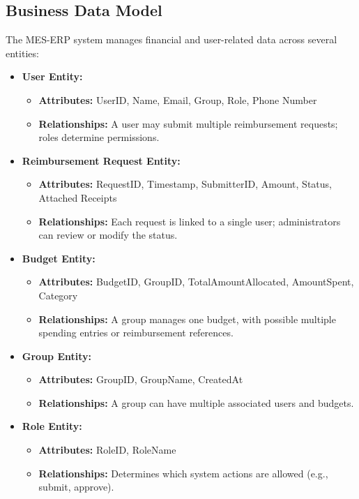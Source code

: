 \documentclass[12pt]{article}
\begin{document}
\subsection{Business Data Model}
The MES-ERP system manages financial and user-related data across several entities:

\begin{itemize}
    \item \textbf{User Entity:}
    \begin{itemize}
        \item \textbf{Attributes:} UserID, Name, Email, Group, Role, Phone Number
        \item \textbf{Relationships:} A user may submit multiple reimbursement requests; roles determine permissions.
    \end{itemize}
    
    \item \textbf{Reimbursement Request Entity:}
    \begin{itemize}
        \item \textbf{Attributes:} RequestID, Timestamp, SubmitterID, Amount, Status, Attached Receipts
        \item \textbf{Relationships:} Each request is linked to a single user; administrators can review or modify the status.
    \end{itemize}
    
    \item \textbf{Budget Entity:}
    \begin{itemize}
        \item \textbf{Attributes:} BudgetID, GroupID, TotalAmountAllocated, AmountSpent, Category
        \item \textbf{Relationships:} A group manages one budget, with possible multiple spending entries or reimbursement references.
    \end{itemize}

    \item \textbf{Group Entity:}
    \begin{itemize}
        \item \textbf{Attributes:} GroupID, GroupName, CreatedAt
        \item \textbf{Relationships:} A group can have multiple associated users and budgets.
    \end{itemize}
    
    \item \textbf{Role Entity:}
    \begin{itemize}
        \item \textbf{Attributes:} RoleID, RoleName
        \item \textbf{Relationships:} Determines which system actions are allowed (e.g., submit, approve).
    \end{itemize}

\end{itemize}
\end{document}
